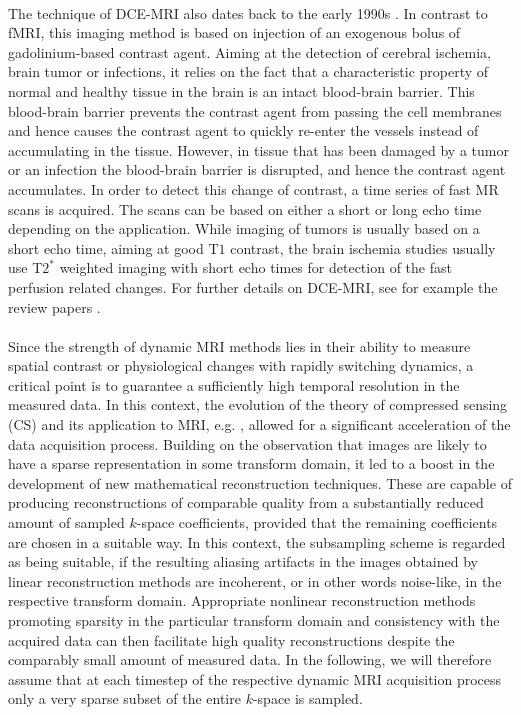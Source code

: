 \\
\noindent
The technique of DCE-MRI also dates back to the early 1990s \cite{tofts91}. 
In contrast to fMRI, this imaging method is based on injection of an exogenous bolus of gadolinium-based contrast agent.  
Aiming at the detection of cerebral ischemia, brain tumor or infections, it relies on the fact that a characteristic property of normal and healthy tissue in the brain is an intact blood-brain barrier. 
This blood-brain barrier prevents the contrast agent from passing the cell membranes and hence causes the contrast agent to quickly re-enter the vessels instead of accumulating in the tissue. 
However, in tissue that has been damaged by a tumor or an infection the blood-brain barrier is disrupted, and hence the contrast agent accumulates.
In order to detect this change of contrast, a time series of fast MR scans is acquired.
The scans can be based on either a short or long echo time depending on the application. 
While imaging of tumors is usually based on a short echo time, aiming at good T$1$ contrast, the brain ischemia studies usually use T$2^\ast$ weighted imaging with short echo times for detection of the fast perfusion related changes. For further details on DCE-MRI, see for example
the review papers \cite{padhani2002,choyke2003,tofts1999}.
\\ 

\\
\noindent
Since the strength of dynamic MRI methods lies in their ability to measure spatial contrast or physiological changes with rapidly switching dynamics, a critical point is to guarantee a sufficiently high temporal resolution in the measured data. 
In this context, the evolution of the theory of compressed sensing (CS) and its application to MRI, e.g. \cite{Candes:Robust,Donoho:CompressedSensing,Lustig:Sparse,Huang:CSinMR}, allowed for a significant acceleration of the data acquisition process. 
Building on the observation that images are likely to have a sparse representation in some transform domain, it led to a boost in the development of new mathematical reconstruction techniques.
These are capable of producing reconstructions of comparable quality from a substantially reduced amount of sampled $k$-space coefficients, provided that the remaining coefficients are chosen in a suitable way. 
In this context, the subsampling scheme is regarded as being suitable, if the resulting aliasing artifacts in the images obtained by linear reconstruction methods are incoherent, or in other words noise-like, in the respective transform domain.
Appropriate nonlinear reconstruction methods promoting sparsity in the particular transform domain and consistency with the acquired data can then facilitate high quality reconstructions despite the comparably small amount of measured data. 
In the following, we will therefore assume that at each timestep of the respective dynamic MRI acquisition process only a very sparse subset of the entire $k$-space is sampled. \\

